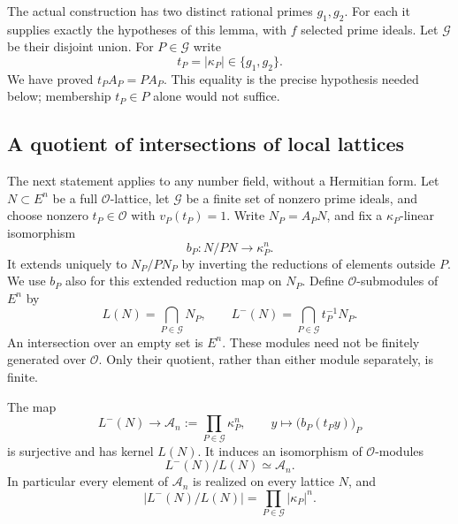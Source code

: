 The actual construction has two distinct rational primes $g_1,g_2$.
For each it supplies exactly the hypotheses of this lemma, with
$f$ selected prime ideals.  Let $\mathcal G$ be their disjoint union.
For $P\in\mathcal G$ write
\[
 t_P=|\kappa_P|\in\{g_1,g_2\}.
\]
We have proved $t_PA_P=PA_P$.  This equality is the precise
hypothesis needed below; membership $t_P\in P$ alone would not suffice.

\subsection{A quotient of intersections of local lattices}

The next statement applies to any number field, without a Hermitian
form.  Let $N\subset E^n$ be a full $\mathcal O$-lattice,
let $\mathcal G$ be a finite set of nonzero prime ideals, and
choose nonzero $t_P\in\mathcal O$ with $v_P(t_P)=1$.
Write $N_P=A_PN$, and fix a $\kappa_P$-linear isomorphism
\[
 b_P:N/PN\longrightarrow\kappa_P^n.
\]
It extends uniquely to $N_P/PN_P$ by inverting the reductions
of elements outside $P$.  We use $b_P$ also for this extended
reduction map on $N_P$.
Define $\mathcal O$-submodules of $E^n$ by
\[
 L(N)=\bigcap_{P\in\mathcal G}N_P,
 \qquad
 L^-(N)=\bigcap_{P\in\mathcal G}t_P^{-1}N_P.
\]
An intersection over an empty set is $E^n$.
These modules need not be finitely generated over $\mathcal O$.
Only their quotient, rather than either module separately, is finite.

\begin{theorem}\label{acc-residues}
The map
\begin{equation}\label{acc-reduction-map}
 L^-(N)\longrightarrow\mathcal A_n:=
       \prod_{P\in\mathcal G}\kappa_P^n,
 \qquad y\longmapsto \bigl(b_P(t_Py)\bigr)_P
\end{equation}
is surjective and has kernel $L(N)$.  It induces an isomorphism
of $\mathcal O$-modules
\[
                    L^-(N)/L(N)\simeq\mathcal A_n.
\]
In particular every element of $\mathcal A_n$ is realized on every
lattice $N$, and
\[
 |L^-(N)/L(N)|=\prod_{P\in\mathcal G}|\kappa_P|^n.
\]
\end{theorem}

